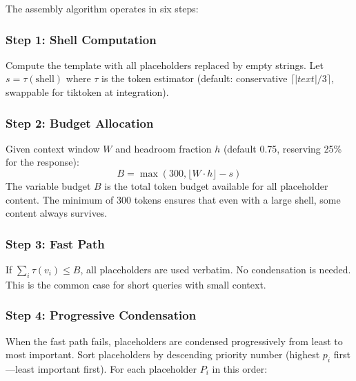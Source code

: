 \documentclass[11pt]{article}
\begin{document}
The assembly algorithm operates in six steps:

\subsubsection{Step 1: Shell Computation}

Compute the template with all placeholders replaced by empty strings.
Let $s = \tau(\text{shell})$ where $\tau$ is the token estimator
(default: conservative $\lceil |text| / 3 \rceil$, swappable for
tiktoken at integration).

\subsubsection{Step 2: Budget Allocation}

Given context window $W$ and headroom fraction $h$ (default 0.75,
reserving 25\% for the response):
\begin{equation}
B = \max\!\left(300, \lfloor W \cdot h \rfloor - s\right)
\label{eq:budget}
\end{equation}
The variable budget $B$ is the total token budget available for all
placeholder content.  The minimum of 300 tokens ensures that even
with a large shell, some content always survives.

\subsubsection{Step 3: Fast Path}

If $\sum_i \tau(v_i) \leq B$, all placeholders are used verbatim.
No condensation is needed.  This is the common case for short queries
with small context.

\subsubsection{Step 4: Progressive Condensation}

When the fast path fails, placeholders are condensed progressively
from least to most important.  Sort placeholders by descending
priority number (highest $p_i$ first---least important first).  For
each placeholder $P_i$ in this order:
\end{document}
